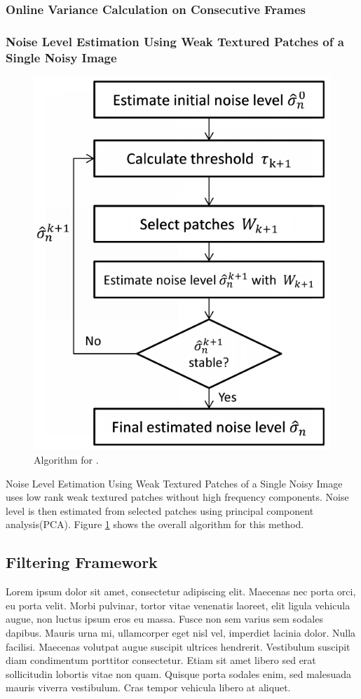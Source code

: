 \documentclass[10pt,twocolumn,letterpaper]{article}
\begin{document}
\subsubsection{Online Variance Calculation on Consecutive Frames}
\subsubsection{Noise Level Estimation Using Weak Textured Patches of a Single Noisy Image}
\begin{figure}
	\includegraphics[width=0.9\columnwidth]{single_image_noise_estimation.png}
	\caption{Algorithm for \cite{noise-weak-texture}.}
	\label{fig:alg-weak-texture}
\end{figure}
Noise Level Estimation Using Weak Textured Patches of a Single Noisy Image\cite{noise-weak-texture} uses low rank weak textured patches without high frequency components. Noise level is then estimated from selected patches using principal component analysis(PCA). Figure \ref{fig:alg-weak-texture} shows the overall algorithm for this method.

\subsection{Filtering Framework}
Lorem ipsum dolor sit amet, consectetur adipiscing elit. Maecenas nec porta orci, eu porta velit. Morbi pulvinar, tortor vitae venenatis laoreet, elit ligula vehicula augue, non luctus ipsum eros eu massa. Fusce non sem varius sem sodales dapibus. Mauris urna mi, ullamcorper eget nisl vel, imperdiet lacinia dolor. Nulla facilisi. Maecenas volutpat augue suscipit ultrices hendrerit. Vestibulum suscipit diam condimentum porttitor consectetur. Etiam sit amet libero sed erat sollicitudin lobortis vitae non quam. Quisque porta sodales enim, sed malesuada mauris viverra vestibulum. Cras tempor vehicula libero at aliquet.
\end{document}

